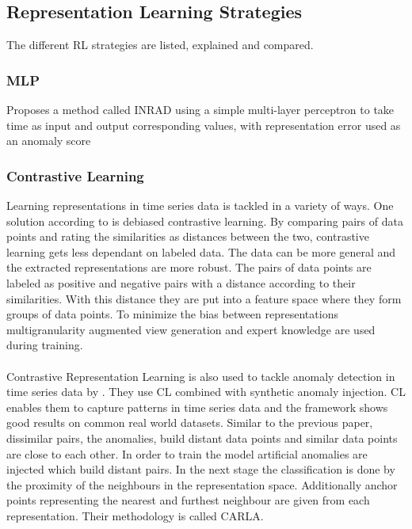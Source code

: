 \subsection{Representation Learning Strategies}
The different RL strategies are listed, explained and compared.\\
\subsubsection{MLP}
Proposes a method called INRAD using a simple multi-layer perceptron to take time as input and output corresponding values, with representation error used as an anomaly score
\cite{jeong_time-series_2022}
\subsubsection{Contrastive Learning}
Learning representations in time series data is tackled in a variety of ways. One solution according to  is debiased contrastive learning. By comparing pairs of data points and rating the similarities as distances between the two, contrastive learning gets less dependant on labeled data. The data can be more general and the extracted representations are more robust. The pairs of data points are labeled as positive and negative pairs with a distance according to their similarities. With this distance they are put into a feature space where they form groups of data points. To minimize the bias between representations multigranularity augmented view generation and expert knowledge are used during training. \\\\
Contrastive Representation Learning is also used to tackle anomaly detection in time series data by . They use CL combined with synthetic anomaly injection. CL enables them to capture patterns in time series data and the framework shows good results on common real world datasets. Similar to the previous paper, dissimilar pairs, the anomalies, build distant data points and similar data points are close to each other. In order to train the model artificial anomalies are injected which build distant pairs. In the next stage the classification is done by  the proximity of the neighbours in the representation space. Additionally anchor points representing the nearest and furthest neighbour are given from each representation. Their methodology is called CARLA.\\\\
